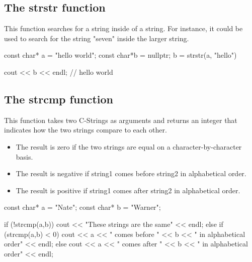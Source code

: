 \documentclass{report}
\begin{document}
    \bigbreak \noindent 
    \subsection{The strstr function}
    \bigbreak \noindent 
    This function searches for a string inside of a string. For instance, it could be used to search for the string "seven" inside the larger string.
    \bigbreak \noindent 

    \begin{cppcode}
        const char* a = "hello world";
        const char*b = nullptr;
        b = strstr(a, "hello")

        cout << b << endl; // hello world
    \end{cppcode}

    \bigbreak \noindent 
    \bigbreak \noindent 

    \pagebreak
    \subsection{The strcmp function}
    \bigbreak \noindent 
    This function takes two C-Strings as arguments and returns an integer that indicates how the two strings compare to each other. 
    \begin{itemize}
        \item The result is zero if the two strings are equal on a character-by-character basis.
        \item The result is negative if string1 comes before string2 in alphabetical order.
        \item The result is positive if string1 comes after string2 in alphabetical order.
    \end{itemize}
    \bigbreak \noindent 

    \begin{cppcode}
        const char* a = "Nate";
        const char* b = "Warner";

        if (!strcmp(a,b)) {
            cout << "These strings are the same" << endl;
        } else if (strcmp(a,b) < 0) {
            cout << a << " comes before " << b << " in alphabetical order" << endl;
        } else {
            cout << a << " comes after " << b << " in alphabetical order" << endl;
        }
    \end{cppcode}


    \bigbreak \noindent 
\end{document}
